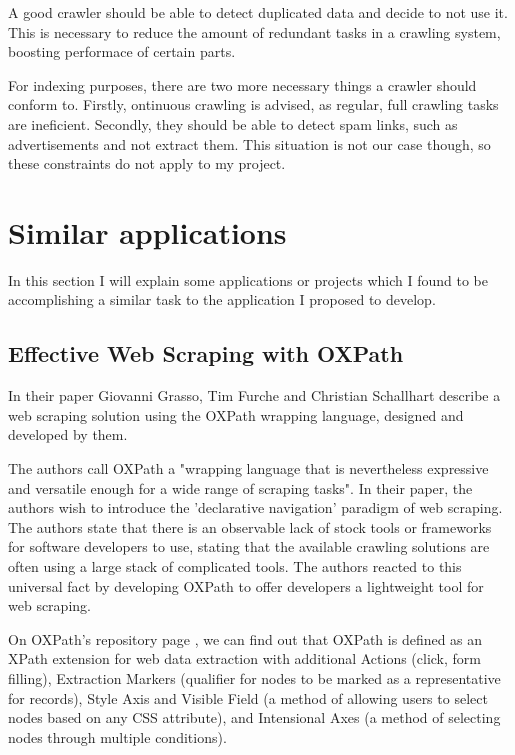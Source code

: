 \documentclass[12pt,a4paper,twoside]{report}
\begin{document}
A good crawler should be able to detect duplicated data and decide to not use it. This is necessary to reduce the amount of redundant tasks in a crawling system, boosting performace of certain parts.

For indexing purposes, there are two more necessary things a crawler should conform to. Firstly, ontinuous crawling is advised, as regular, full crawling tasks are ineficient. Secondly, they should be able to detect spam links, such as advertisements and not extract them. This situation is not our case though, so these constraints do not apply to my project.


\section{Similar applications}

In this section I will explain some applications or projects which I found to be accomplishing a similar task to the application I proposed to develop.


\subsection{Effective Web Scraping with OXPath}

In their paper \cite{oxpath_scraping} Giovanni Grasso, Tim Furche and Christian Schallhart describe a web scraping solution using the OXPath wrapping language, designed and developed by them.

The authors call OXPath a "wrapping language that is nevertheless expressive and versatile enough for a wide range of scraping tasks". In their paper, the authors wish to introduce the 'declarative navigation' paradigm of web scraping. The authors state that there is an observable lack of stock tools or frameworks for software developers to use, stating that the available crawling solutions are often using a large stack of complicated tools. The authors reacted to this universal fact by developing OXPath to offer developers a lightweight tool for web scraping.

On OXPath's repository page \cite{oxpath_repo}, we can find out that OXPath is defined as an XPath extension for web data extraction with additional Actions (click, form filling), Extraction Markers (qualifier for nodes to be marked as a representative for records), Style Axis and Visible Field (a method of allowing users to select nodes based on any CSS attribute), and Intensional Axes (a method of selecting nodes through multiple conditions).
\end{document}
